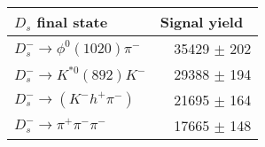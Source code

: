  \begin{tabular}{l r }
\hline\hline
$D_s$ final state  & Signal yield\ \\
\hline
$D_{s}^{-} \to \phi^{0}(1020)\pi^{-}$ & 35429 $\pm$ 202 \\
$D_{s}^{-}\to K^{*0}(892)K^{-}$ & 29388 $\pm$ 194 \\
$D_{s}^{-}\to (K^{-}h^{+}\pi^{-})$ & 21695 $\pm$ 164 \\
$D_{s}^{-}\to \pi^{+}\pi^{-}\pi^{-}$ & 17665 $\pm$ 148 \\
\hline\hline
\end{tabular}
\label{table:normYieldsDs}
